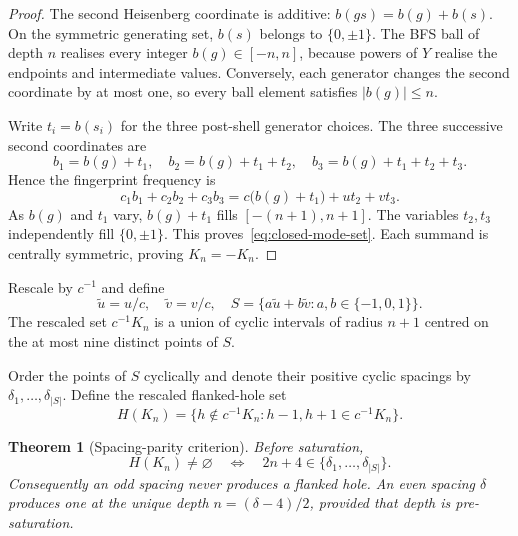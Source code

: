 \documentclass[11pt,a4paper]{article}
\newtheorem{theorem}{Theorem}[section]
\theoremstyle{definition}
\theoremstyle{remark}
\begin{document}
\begin{proof}
  The second Heisenberg coordinate is additive:
  $b(gs)=b(g)+b(s)$.
  On the symmetric generating set, $b(s)$ belongs to $\{0,\pm1\}$.
  The BFS ball of depth $n$ realises every integer $b(g)\in[-n,n]$, because powers of
  $Y$ realise the endpoints and intermediate values.
  Conversely, each generator changes the second coordinate by at most one, so every ball
  element satisfies $|b(g)|\leq n$.

  Write $t_i=b(s_i)$ for the three post-shell generator choices.
  The three successive second coordinates are
  \[
    b_1=b(g)+t_1,
    \quad b_2=b(g)+t_1+t_2,
    \quad b_3=b(g)+t_1+t_2+t_3.
  \]
  Hence the fingerprint frequency is
  \[
    c_1b_1+c_2b_2+c_3b_3
    =c\bigl(b(g)+t_1\bigr)+ut_2+vt_3.
  \]
  As $b(g)$ and $t_1$ vary, $b(g)+t_1$ fills $[-(n+1),n+1]$.
  The variables $t_2,t_3$ independently fill $\{0,\pm1\}$.
  This proves~\eqref{eq:closed-mode-set}.
  Each summand is centrally symmetric, proving $K_n=-K_n$.
\end{proof}

Rescale by $c^{-1}$ and define
\begin{equation}
  \widetilde u=u/c,
  \quad \widetilde v=v/c,
  \quad
  S=\{a\widetilde u+b\widetilde v:a,b\in\{-1,0,1\}\}.
  \label{eq:centre-set}
\end{equation}
The rescaled set $c^{-1}K_n$ is a union of cyclic intervals of radius $n+1$ centred on the
at most nine distinct points of $S$.

Order the points of $S$ cyclically and denote their positive cyclic spacings by
$\delta_1,\ldots,\delta_{|S|}$.
Define the rescaled flanked-hole set
\begin{equation}
  H(K_n)=\{h\notin c^{-1}K_n:h-1,h+1\in c^{-1}K_n\}.
  \label{eq:flanked-holes-rescaled}
\end{equation}

\begin{theorem}[Spacing-parity criterion]
  \label{thm:spacing}
  Before saturation,
  \begin{equation}
    H(K_n)\ne\varnothing
    \quad\Longleftrightarrow\quad
    2n+4\in\{\delta_1,\ldots,\delta_{|S|}\}.
    \label{eq:spacing-criterion}
  \end{equation}
  Consequently an odd spacing never produces a flanked hole.
  An even spacing $\delta$ produces one at the unique depth
  $n=(\delta-4)/2$, provided that depth is pre-saturation.
\end{theorem}
\end{document}
